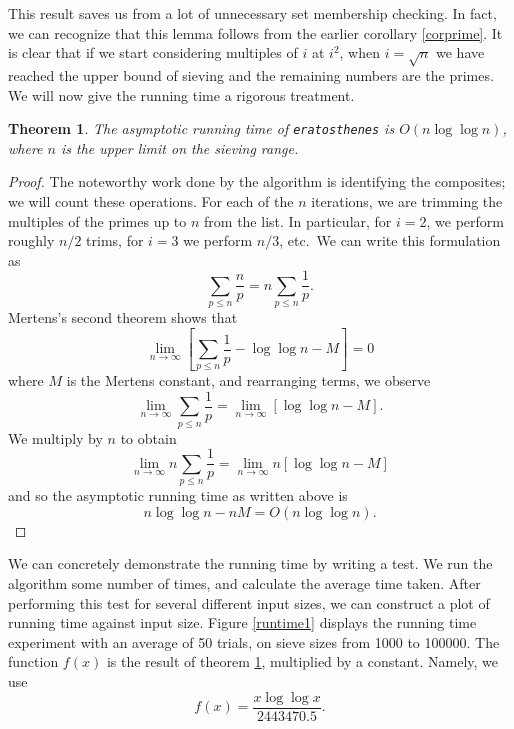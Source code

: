\documentclass{amsart}
\newtheorem{thm}{Theorem}
\theoremstyle{definition}
\theoremstyle{case}
\begin{document}
	This result saves us from a lot of unnecessary set membership checking. In fact, we can recognize that this lemma follows from the earlier corollary \ref{corprime}. It is clear that if we start considering multiples of $i$ at $i^2$, when $i = \sqrt{n}$ we have reached the upper bound of sieving and the remaining numbers are the primes. We will now give the running time a rigorous treatment.
	
	\begin{thm}\label{runtimethm}
		The asymptotic running time of \texttt{eratosthenes} is $O(n\log\log n)$, where $n$ is the upper limit on the sieving range.
	\end{thm}
	\begin{proof}
		The noteworthy work done by the algorithm is identifying the composites; we will count these operations. For each of the $n$ iterations, we are trimming the multiples of the primes up to $n$ from the list. In particular, for $i=2$, we perform roughly $n/2$ trims, for $i=3$ we perform $n/3$, etc.\ We can write this formulation as
		$$ \sum_{p\leq n} \frac{n}{p} = n \sum_{p \leq n} \frac{1}{p} . $$
		Mertens's second theorem shows that
		$$ \lim\limits_{n\rightarrow\infty} \left[ \sum_{p \leq n} \frac{1}{p} - \log\log n - M \right] = 0 $$
		where $M$ is the Mertens constant, and rearranging terms, we observe
		$$ \lim\limits_{n\rightarrow\infty} \sum_{p \leq n} \frac{1}{p} = \lim\limits_{n\rightarrow\infty} \left[ \log\log n - M \right] . $$
		We multiply by $n$ to obtain
		$$ \lim\limits_{n\rightarrow\infty} n \sum_{p \leq n} \frac{1}{p} = \lim\limits_{n\rightarrow\infty} n \left[ \log\log n - M \right] $$
		and so the asymptotic running time as written above is
		$$ n \log \log n - nM = O(n\log\log n). $$
	\end{proof}
	
	We can concretely demonstrate the running time by writing a test. We run the algorithm some number of times, and calculate the average time taken. After performing this test for several different input sizes, we can construct a plot of running time against input size. Figure \ref{runtime1} displays the running time experiment with an average of 50 trials, on sieve sizes from 1000 to 100000. The function $f(x)$ is the result of theorem \ref{runtimethm}, multiplied by a constant. Namely, we use
	$$ f(x) = \frac{x \log \log x}{2443470.5} . $$
	
\end{document}

